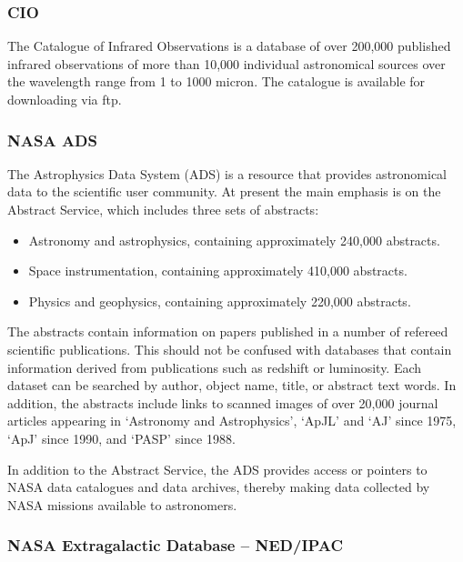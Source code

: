 \documentclass[twoside,11pt]{article}
\newcommand{\htmladdnormallink}[2]{#1}
\newcommand{\xlabel}[1]{}
\newcommand{\NEDref}{\htmladdnormallink{NED}{http://ds.internic.net/cgi-bin/enthtml/database/ned.b}}
\newcommand{\ADSref}{\htmladdnormallink{ADS}{http://adswww.harvard.edu/}}
\begin{document}
\subsubsection{CIO} \xlabel{CIO}
\label{sec:cio}
 
The Catalogue of Infrared Observations is a database of over 200,000
published infrared observations of more than 10,000 individual astronomical
sources over the wavelength range from 1 to 1000 micron. The catalogue is
available for downloading via ftp. 

\subsubsection{NASA {\ADSref}} \xlabel{ADS}
\label{sec:ads}
 
The Astrophysics Data System ({\ADSref}) is a resource that provides
astronomical data to the scientific user community. At present the main
emphasis is on the Abstract Service, which includes three sets of abstracts: 

\begin{itemize}
\item Astronomy and astrophysics, containing approximately 240,000 abstracts. 
\item Space instrumentation, containing approximately 410,000 abstracts.
\item Physics and geophysics, containing approximately 220,000 abstracts. 
\end{itemize}

The abstracts contain information on papers published in a number of refereed
scientific publications. This should not be confused with databases that contain 
information derived from publications such as redshift or luminosity.
Each dataset can be searched by author, object name, title, or abstract text
words. In addition, the abstracts include links to scanned images of over
20,000 journal articles appearing in `Astronomy and Astrophysics',
 `ApJL' and `AJ' since 1975, `ApJ'
since 1990, and `PASP' since 1988. 

In addition to the Abstract Service, the {\ADSref} provides access or pointers to
NASA data catalogues and data archives, thereby making data collected by NASA
missions available to astronomers. 

\subsubsection{NASA Extragalactic Database -- {\NEDref}/IPAC} \xlabel{NED}
\label{sec:ned}
\end{document}
